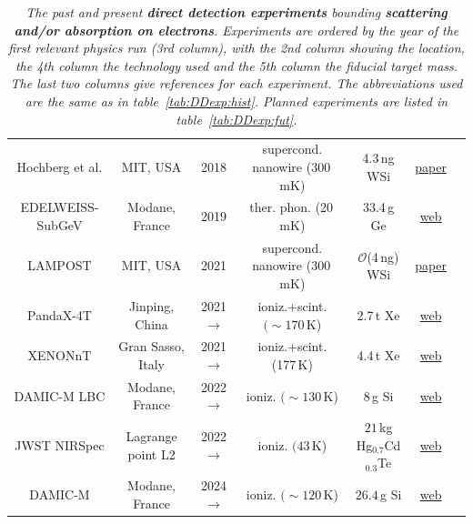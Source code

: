 \begin{table}[t]
\begin{center}
{\begin{tabular}{ccccccc}
{\sc Hochberg et al.} & MIT, USA  & 2018 & supercond. nanowire (300\,mK) & 4.3\,ng WSi& \href{https://journals.aps.org/prl/pdf/10.1103/PhysRevLett.123.151802}{paper} & \cite{DM:electron:superconductors:nanowiresHochberg}
\\

{\sc EDELWEISS-SubGeV} & Modane, France & 2019 & ther. phon. (20\,mK) & 33.4\,g Ge& \href{http://edelweiss.in2p3.fr}{web} & \cite{EDELWEISS-SubGeV}
\\

{\sc LAMPOST} &  MIT, USA & 2021 & supercond. nanowire (300\,mK) & ${\mathcal O}$(4\,ng) WSi& \href{http://edelweiss.in2p3.fr}{paper} & \cite{LAMPOST}
\\

{\sc PandaX-4T} & Jinping, China & 2021 $\to$ &  ioniz.+scint. $(\sim 170\,$K) & 2.7\,t Xe & \href{https://pandax.sjtu.edu.cn}{web} & \cite{PandaX-4T}\\
{\sc XENONnT} & Gran Sasso, Italy & 2021 $\to$  &  ioniz.+scint. (177\,K) & 4.4\,t Xe & \href{http://www.xenon1t.org}{web} & \cite{Xenon-nT}\\

 {\sc DAMIC-M LBC} & Modane, France & 2022 $\to$ &  ioniz. $(\sim130\,$K) & $8$\,g Si &  \href{http://damic.uchicago.edu}{web} & \cite{DAMIC-M-LBC} \\
 
  {\sc JWST NIRSpec} & Lagrange point L2 & 2022 $\to$ &  ioniz. $(43\,$K) & $21$\,kg Hg${}_{0.7}$Cd${}_{0.3}$Te &  \href{https://jwst-docs.stsci.edu/jwst-near-infrared-spectrograph}{web} & \cite{JWST NIRSpec} \\
  
   {\sc DAMIC-M} & Modane, France & 2024 $\to$ &  ioniz. $(\sim120\,$K) & $26.4$\,g Si &  \href{http://damic.uchicago.edu}{web} & \cite{DAMIC-M} \\

\hline\hline
\end{tabular}}
\end{center}
\caption[electron scattering]{\em The past and present {\bfseries direct detection experiments} bounding {\bfseries scattering and/or absorption on electrons}. Experiments are ordered by the year of the first relevant physics run (3rd column), with the 2nd column showing the location, the 4th column the technology used and the 5th column the fiducial target mass.
 The last two columns give references for each experiment.   The abbreviations used are the same as in table~\ref{tab:DDexp:hist}. Planned experiments are listed in table~\ref{tab:DDexp:fut}.
\label{tab:Directional:exp}}
\end{table}

